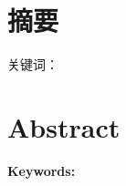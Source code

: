 {\begin{titlepage}
\begin{center}
\end{center}
\end{titlepage}


\clearpage

\chapter*{摘\quad 要}
{}

\setcounter{page}{1}
\song {}
\cabstract
\vspace{\baselineskip}

\hangindent=51pt\noindent
{\hei 关键词}：\ckeywords

\clearpage

\chapter*{\textbf{Abstract}}
{}

\eabstract
\vspace{\baselineskip}

\hangindent=60pt\noindent
{\textbf{Keywords:}}  \ekeywords

}
